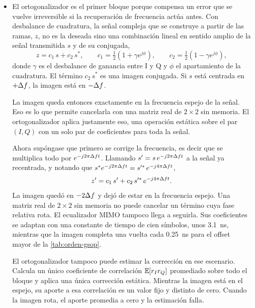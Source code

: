 \begin{itemize}

\item El ortogonalizador es el primer bloque porque compensa un error que se
vuelve irreversible si la recuperaci\'on de frecuencia act\'ua antes. Con
desbalance de cuadratura, la se\~nal compleja que se construye a partir de las
ramas, $z$, no es la deseada sino una combinaci\'on lineal en sentido amplio
de la se\~nal transmitida $s$ y de su conjugada,
\begin{equation}
  z = c_1\,s + c_2\,s^{*},
  \qquad
  c_1 = \tfrac{1}{2}\left(1 + \gamma e^{j\phi}\right),
  \qquad
  c_2 = \tfrac{1}{2}\left(1 - \gamma e^{j\phi}\right),
  \label{eq:iq-imbalance}
\end{equation}
donde $\gamma$ es el desbalance de ganancia entre I y Q y $\phi$ el
apartamiento de la cuadratura. El t\'ermino $c_2\,s^{*}$ es una imagen
conjugada. Si $s$ est\'a centrada en $+\Delta f$, la imagen est\'a en $-\Delta f$.

La imagen queda entonces exactamente en la frecuencia espejo de la se\~nal.
Eso es lo que permite cancelarla con una matriz real de $2\times2$ sin
memoria. El ortogonalizador aplica justamente eso, una operaci\'on
est\'atica sobre el par $(I, Q)$ con un solo par de coeficientes para toda la
se\~nal.

Ahora sup\'ongase que primero se corrige la frecuencia, es decir que se
multiplica todo por $e^{-j2\pi\Delta f t}$. Llamando $s' = s\,e^{-j2\pi\Delta f t}$ a la
se\~nal ya recentrada, y notando que
$s^{*}e^{-j2\pi\Delta f t} = s'^{*}\,e^{-j4\pi\Delta f t}$,
\begin{equation}
  z' = c_1\,s' + c_2\,s'^{*}\,e^{-j4\pi\Delta f t}.
  \label{eq:imagen-rotante}
\end{equation}
La imagen qued\'o en $-2\Delta f$ y dej\'o de estar en la frecuencia espejo. Una
matriz real de $2\times2$ sin memoria no puede cancelar un t\'ermino cuya fase
relativa rota. El ecualizador MIMO tampoco llega a seguirla. Sus coeficientes
se adaptan con una constante de tiempo de cien s\'imbolos, unos
\SI{3.1}{\nano\second}, mientras que la imagen completa una vuelta cada
\SI{0.25}{\nano\second} para el offset mayor de la \cref{tab:orden-gsop}.

El ortogonalizador tampoco puede estimar la correcci\'on en ese escenario.
Calcula un \'unico coeficiente de correlaci\'on $\mathbb{E}\!\left[r_I r_Q\right]$ promediado sobre
todo el bloque y aplica una \'unica correcci\'on est\'atica. Mientras la imagen
est\'a en el espejo, su aporte a esa correlaci\'on es un valor fijo y distinto
de cero. Cuando la imagen rota, el aporte promedia a cero y la estimaci\'on
falla.


\end{itemize}
